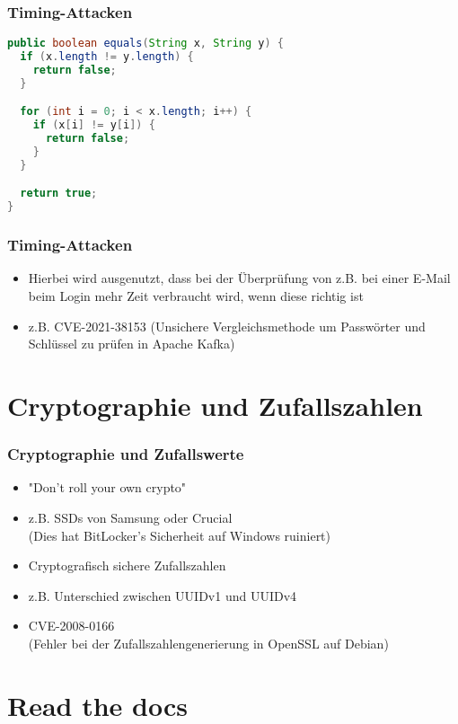 \documentclass[ngerman2]{beamer}
\begin{document}
\begin{frame}[fragile]
\frametitle{Timing-Attacken}
  \begin{lstlisting}[language=Java]
public boolean equals(String x, String y) {
  if (x.length != y.length) {
    return false;
  }

  for (int i = 0; i < x.length; i++) {
    if (x[i] != y[i]) {
      return false;
    }
  }

  return true;
}
  \end{lstlisting}
\end{frame}

\begin{frame}[fragile]
\frametitle{Timing-Attacken}
  \begin{itemize}
    \item Hierbei wird ausgenutzt, dass bei der Überprüfung von z.B. bei einer
      E-Mail beim Login mehr Zeit verbraucht wird, wenn diese richtig ist
    \item z.B. CVE-2021-38153
      (Unsichere Vergleichsmethode um Passwörter und Schlüssel zu prüfen in Apache Kafka)
      \cite{CVE202138153}
  \end{itemize}
\end{frame}

\section{Cryptographie und Zufallszahlen}

\begin{frame}[fragile]
\frametitle{Cryptographie und Zufallswerte}
  \begin{itemize}
    \item "Don't roll your own crypto"
    \item z.B. SSDs von Samsung oder Crucial \cite{ssdscrypt}\\
      (Dies hat BitLocker's Sicherheit auf Windows ruiniert)
      \cite{bitlockermssoftware}
    \item Cryptografisch sichere Zufallszahlen
    \item z.B. Unterschied zwischen UUIDv1 und UUIDv4 \cite{uuid}
    \item CVE-2008-0166\\
      (Fehler bei der Zufallszahlengenerierung in OpenSSL auf Debian)
      \cite{debiansslcve}
      \cite{debiansslcvenist}
  \end{itemize}
\end{frame}

\section{Read the docs}
\end{document}
